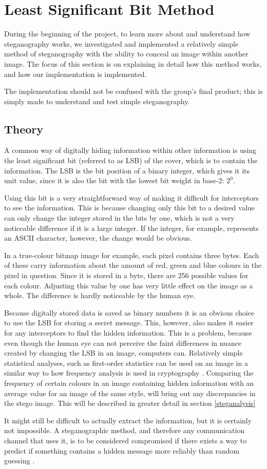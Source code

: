 \section{Least Significant Bit Method}
During the beginning of the project, to learn more about and understand how steganography works, we investigated and implemented a relatively simple method of steganography with the ability to conceal an image within another image.
The focus of this section is on explaining in detail how this method works, and how our implementation is implemented.

The implementation should not be confused with the group's final product; this is simply made to understand and test simple steganography.

\subsection{Theory}
A common way of digitally hiding information within other information is using the least significant bit (referred to as LSB) of the cover, which is to contain the information.
The LSB is the bit position of a binary integer, which gives it its unit value, since it is also the bit with the lowest bit weight in base-2: $2^0$.

Using this bit is a very straightforward way of making it difficult for interceptors to see the information.
This is because changing only this bit to a desired value can only change the integer stored in the bits by one, which is not a very noticeable difference if it is a large integer.
If the integer, for example, represents an ASCII character, however, the change would be obvious.

In a true-colour bitmap image for example, each pixel contains three bytes.
Each of these carry information about the amount of red, green and blue colours in the pixel in question.
Since it is stored in a byte, there are 256 possible values for each colour.
Adjusting this value by one has very little effect on the image as a whole.
The difference is hardly noticeable by the human eye.

Because digitally stored data is saved as binary numbers it is an obvious choice to use the LSB for storing a secret message.
This, however, also makes it easier for any interceptors to find the hidden information.
This is a problem, because even though the human eye can not perceive the faint differences in nuance created by changing the LSB in an image, computers can.
Relatively simple statistical analyses, such as first-order statistics can be used on an image in a similar way to how frequency analysis is used in cryptography \citep{Hetzl2005}.
Comparing the frequency of certain colours in an image containing hidden information with an average value for an image of the same style, will bring out any discrepancies in the stego image.
This will be described in greater detail in section \ref{steganalysis}

It might still be difficult to actually extract the information, but it is certainly not impossible.
A steganographic method, and therefore any communication channel that uses it, is to be considered compromised if there exists a way to predict if something contains a hidden message more reliably than random guessing \citep{Bohme2004}.
